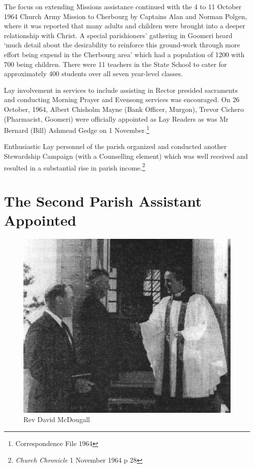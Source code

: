 The focus on extending Missions assistance continued with the 4 to 11 October 1964 Church Army Mission to Cherbourg by Captains Alan and Norman Polgen, where it was reported that many adults and children were brought into a deeper relationship with Christ. A special parishioners' gathering in Goomeri heard `much detail about the desirability to reinforce this ground-work through more effort being expend in the Cherbourg area' which had a population of 1200 with 700 being children. There were 11 teachers in the State School to cater for approximately 400 students over all seven year-level classes.



Lay involvement in services to include assisting in Rector presided sacraments and conducting Morning Prayer and Evensong services was encouraged. On 26 October, 1964, Albert Chisholm Mayne (Bank Officer, Murgon), Trevor Cichero (Pharmacist, Goomeri) were officially appointed as Lay Readers as was Mr Bernard (Bill) Ashmead Gedge on 1 November.\footnote{Correspondence File 1964}


Enthusiastic Lay personnel of the parish organized and conducted another Stewardship Campaign (with a Counselling element) which was well received and resulted in a substantial rise in parish income.\footnote{\emph{Church Chronicle} 1 November 1964 p 28}


\section{The Second Parish Assistant Appointed}









\begin{figure}
\begin{center}
\includegraphics[width=1.\linewidth,center]{../images/DMcDougall.jpg}
\caption{Rev David McDougall}
\end{center}
\end{figure}





